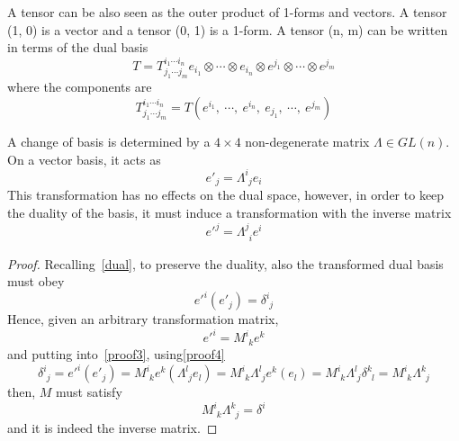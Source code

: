     A tensor can be also seen as the outer product of 1-forms and vectors. A tensor (1, 0) is a vector and a tensor (0, 1) is a 1-form. A tensor (n, m) can be written in terms of the dual basis
    \begin{equation*}
        T = T^{i_1 \cdots i_n}_{j_1 \cdots j_m} e_{i_1} \otimes \cdots \otimes e_{i_n} \otimes e^{j_1} \otimes \cdots \otimes e^{j_m}
    \end{equation*}
    where the components are
    \begin{equation*}
        T^{i_1 \cdots i_n}_{j_1 \cdots j_m} = T(e^{i_1}, ~\cdots, ~e^{i_n}, ~e_{j_1}, ~\cdots, ~e^{j_m})
    \end{equation*}

    A change of basis is determined by a $4 \times 4$ non-degenerate matrix $\Lambda \in GL(n)$. On a vector basis, it acts as 
    \begin{equation}\label{proof4}
        {e'}_j = \Lambda^i_{\phantom i j} e_i
    \end{equation}
    This transformation has no effects on the dual space, however, in order to keep the duality of the basis, it must induce a transformation with the inverse matrix 
    \begin{equation*}
        {e'}^j = \Lambda^j_{\phantom j i} e^i
    \end{equation*}

    \begin{proof}
        Recalling~\eqref{dual}, to preserve the duality, also the transformed dual basis must obey 
        \begin{equation}\label{proof3}
            {e'}^i ({e'}_j) = \delta^i_{\phantom i j}
        \end{equation}
        Hence, given an arbitrary transformation matrix, 
        \begin{equation*}
            {e'}^i = M^i_{\phantom i k} e^k
        \end{equation*}
        and putting into~\eqref{proof3}, using\eqref{proof4}
        \begin{equation*}
            \delta^i_{\phantom i j} = {e'}^i ({e'}_j) = M^i_{\phantom i k} e^k (\Lambda^l_{\phantom l j} e_l) = M^i_{\phantom i k} \Lambda^l_{\phantom l j} e^k(e_l) = M^i_{\phantom i k} \Lambda^l_{\phantom l j} \delta^k_{\phantom k l} = M^i_{\phantom i k} \Lambda^k_{\phantom k j}
        \end{equation*}
        then, $M$ must satisfy
        \begin{equation*}
            M^i_{\phantom i k} \Lambda^k_{\phantom k j} = \delta^i_{\phantom j} 
        \end{equation*}
        and it is indeed the inverse matrix.
    \end{proof}

